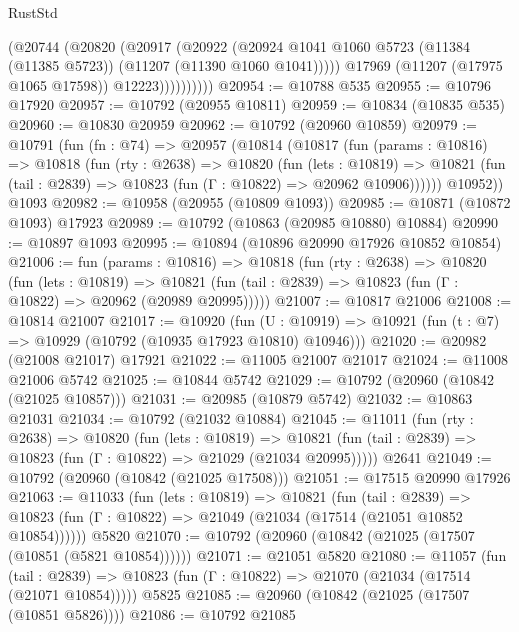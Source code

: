 \begin{lexlean}{RustStd}
\begin{coremodule}
                    (@20744
                      (@20820
                        (@20917
                          (@20922
                            (@20924
                              @1041
                              @1060
                              @5723
                              (@11384 (@11385 @5723))
                              (@11207 (@11390 @1060 @1041)))))
                        @17969
                        (@11207 (@17975 @1065 @17598))
                        @12223))))))))))
@20954 := @10788 @535
@20955 := @10796 @17920
@20957 := @10792 (@20955 @10811)
@20959 := @10834 (@10835 @535)
@20960 := @10830 @20959
@20962 := @10792 (@20960 @10859)
@20979 := @10791
    (fun (fn : @74) =>
    @20957
      (@10814
        (@10817
          (fun (params : @10816) =>
          @10818
            (fun (rty : @2638) =>
            @10820
              (fun (lets : @10819) =>
              @10821 (fun (tail : @2839) => @10823 (fun (Γ : @10822) => @20962 @10906))))))
        @10952))
    @1093
@20982 := @10958 (@20955 (@10809 @1093))
@20985 := @10871 (@10872 @1093) @17923
@20989 := @10792 (@10863 (@20985 @10880) @10884)
@20990 := @10897 @1093
@20995 := @10894 (@10896 @20990 @17926 @10852 @10854)
@21006 := fun (params : @10816) =>
  @10818
    (fun (rty : @2638) =>
    @10820
      (fun (lets : @10819) =>
      @10821 (fun (tail : @2839) => @10823 (fun (Γ : @10822) => @20962 (@20989 @20995)))))
@21007 := @10817 @21006
@21008 := @10814 @21007
@21017 := @10920
    (fun (U : @10919) => @10921 (fun (t : @7) => @10929 (@10792 (@10935 @17923 @10810) @10946)))
@21020 := @20982 (@21008 @21017) @17921
@21022 := @11005 @21007 @21017
@21024 := @11008 @21006 @5742
@21025 := @10844 @5742
@21029 := @10792 (@20960 (@10842 (@21025 @10857)))
@21031 := @20985 (@10879 @5742)
@21032 := @10863 @21031
@21034 := @10792 (@21032 @10884)
@21045 := @11011
    (fun (rty : @2638) =>
    @10820
      (fun (lets : @10819) =>
      @10821 (fun (tail : @2839) => @10823 (fun (Γ : @10822) => @21029 (@21034 @20995)))))
    @2641
@21049 := @10792 (@20960 (@10842 (@21025 @17508)))
@21051 := @17515 @20990 @17926
@21063 := @11033
    (fun (lets : @10819) =>
    @10821
      (fun (tail : @2839) =>
      @10823 (fun (Γ : @10822) => @21049 (@21034 (@17514 (@21051 @10852 @10854))))))
    @5820
@21070 := @10792 (@20960 (@10842 (@21025 (@17507 (@10851 (@5821 @10854))))))
@21071 := @21051 @5820
@21080 := @11057
    (fun (tail : @2839) => @10823 (fun (Γ : @10822) => @21070 (@21034 (@17514 (@21071 @10854)))))
    @5825
@21085 := @20960 (@10842 (@21025 (@17507 (@10851 @5826))))
@21086 := @10792 @21085

\end{coremodule}
\end{lexlean}
